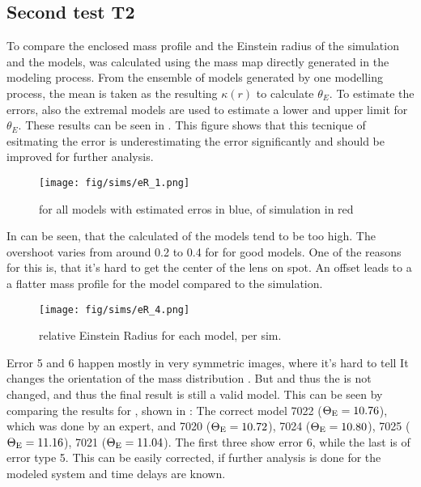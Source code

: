 \subsection{Second test T2} \label{sec:results.2}

To compare the enclosed mass profile and the Einstein radius of the simulation and the models, \kenc was calculated using the mass map \kap[x,y] directly generated in the modeling process.
From the ensemble of models generated by one modelling process, the mean is taken as the resulting $\kappa(r)$ to calculate $\theta_E$.
To estimate the errors, also the extremal models are used to estimate a lower and upper limit for $\theta_E$.
These results can be seen in .
This figure shows that this tecnique of esitmating the error is underestimating the error significantly and should be improved for further analysis.

\begin{figure}[htbp]
  \centering
    \texttt{[image: fig/sims/eR\_1.png]}
  \caption{\tEr \gEr for all models with estimated erros in blue, \gEr of simulation in red}
  \label{fig:eR_all_models}
\end{figure}

In  can be seen, that the calculated \tEr \gEr of the models tend to be too high.
The overshoot varies from around 0.2 to 0.4 for for good models.
One of the reasons for this is, that it's hard to get the center of the lens on spot.
An offset leads to a a flatter mass profile for the model compared to the simulation.



\begin{figure}[htbp]
  \centering
    \texttt{[image: fig/sims/eR\_4.png]}
  \caption{relative Einstein Radius for each model, per sim. }
  \label{fig:eR_per_sim}
\end{figure}


Error 5 and 6 happen mostly in very symmetric images, where it's hard to tell
It changes the orientation of the mass distribution \kap[x,y].
But \kenc and thus the \tEr \gEr is not changed, and thus the final result is still a valid model.
This can be seen by comparing the results for , shown in : 
The correct model 7022 ($\Theta_\text{E}=10.76$), which was done by an expert, and
7020 ($\Theta_\text{E}=10.72$),
7024 ($\Theta_\text{E}=10.80$),
7025 ($\Theta_\text{E}=11.16$),
7021 ($\Theta_\text{E}=11.04$).
The first three show error 6, while the last is of error type 5.
This can be easily corrected, if further analysis is done for the modeled system and time delays are known.

